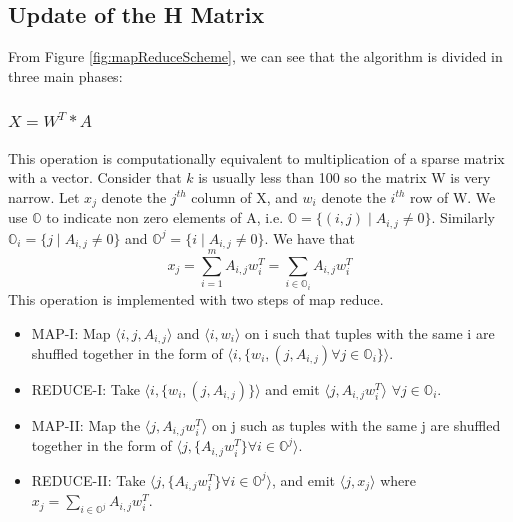 \documentclass[a4paper,12pt]{article}
\begin{document}
 \subsection{Update of the H Matrix}
 \label{sec:hupdate}
    From Figure \ref{fig:mapReduceScheme}, we can see that the algorithm is divided in three main phases:
    
  \subsubsection{$ X = W^T * A $}
        This operation is computationally equivalent to multiplication of a sparse matrix with a vector. 
        Consider that $k$ is usually less than 100 so the matrix W is very narrow. 
		Let $x_j$ denote the $j^{th}$ column of X, and $w_i$ denote the $i^{th}$ row of W.
		We use $\mathbb{O}$ to indicate non zero elements of A, i.e. $\mathbb{O} = \{ (i,j) \;|\; A_{i,j}  \neq 0 \}$.
		Similarly $\mathbb{O}_i = \{j \;|\; A_{i,j} \neq 0 \}$ and $\mathbb{O}^j = \{i \;|\; A_{i,j} \neq 0 \}$.
		We have that
        $$ x_j = \sum_{i=1}^{m} A_{i,j} w_{i}^{T} = \sum_{i \in \mathbb{O}_i} A_{i,j} w_{i}^{T} $$ 
        This operation is implemented with two steps of map reduce.
        
        \begin{itemize}
          \item MAP-I: Map $ \langle i, j, A_{i,j} \rangle $ and $\langle i, w_i \rangle$ on i
            such that tuples with the same i are shuffled together in
            the form of  $ \langle i, \{w_{i}, (j, A_{i,j}) \forall j
            \in \mathbb{O}_i \} \rangle$.

         \item REDUCE-I: Take  $ \langle i, \{w_{i}, (j, A_{i,j}) \}
           \rangle$ and emit  $ \langle j, A_{i,j}  w_{i}^{T}
           \rangle$ $\forall j \in \mathbb{O}_i $.

          \item MAP-II: Map the $ \langle j, A_{i,j}  w_{i}^{T}
           \rangle$ on j such as tuples with the same j are shuffled
           together in the form of $ \langle j, \{A_{i,j}  w_{i}^{T} \}
           \forall i \in \mathbb{O}^j \rangle$.

          \item REDUCE-II: Take $ \langle j, \{A_{i,j}  w_{i}^{T} \}
           \forall i \in \mathbb{O}^j \rangle$, and emit $\langle j,
           x_j \rangle$ where $ x_j = \sum_{i \in \mathbb{O}^j} A_{i,j}  w_{i}^{T} $.

         \end{itemize}
\end{document}
